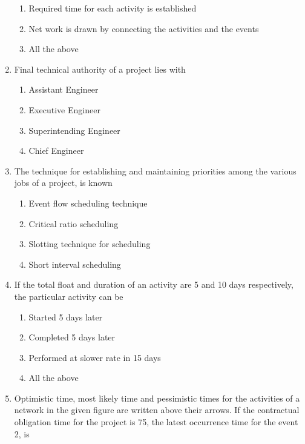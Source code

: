 \documentclass[11pt,a4paper]{article}
\begin{document}
\begin{enumerate}
\begin{enumerate}[label=\Alph*.]
\item{Required time for each activity is established}
\item{Net work is drawn by connecting the activities and the events}
\item{All the above}
\end{enumerate}
\item{Final technical authority of a project lies with}
\begin{enumerate}[label=\Alph*.]
\item{Assistant Engineer}
\item{Executive Engineer}
\item{Superintending Engineer}
\item{Chief Engineer}
\end{enumerate}
\item{The technique for establishing and maintaining priorities among the various jobs of a project, is known}
\begin{enumerate}[label=\Alph*.]
\item{Event flow scheduling technique}
\item{Critical ratio scheduling}
\item{Slotting technique for scheduling}
\item{Short interval scheduling}
\end{enumerate}
\item{If the total float and duration of an activity are 5 and 10 days respectively, the particular activity can be}
\begin{enumerate}[label=\Alph*.]
\item{Started 5 days later}
\item{Completed 5 days later}
\item{Performed at slower rate in 15 days}
\item{All the above}
\end{enumerate}
\item{Optimistic time, most likely time and pessimistic times for the activities of a network in the given figure are written above their arrows. If the contractual obligation time for the project is 75, the latest occurrence time for the event 2, is \\

}
\end{enumerate}
\end{document}
